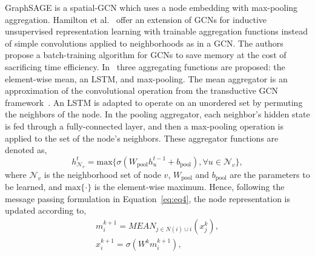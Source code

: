 GraphSAGE is a spatial-GCN which uses a node embedding with max-pooling aggregation. Hamilton et al.~ offer an extension of GCNs for inductive unsupervised representation learning with trainable aggregation functions instead of simple convolutions applied to neighborhoods as in a GCN. The authors propose a batch-training algorithm for GCNs to save memory at the cost of sacrificing time efficiency.
In~ three aggregating functions are proposed: the element-wise mean, an LSTM, and max-pooling. 
The mean aggregator is an approximation of the convolutional operation from the transductive GCN framework~. An LSTM is adapted to operate on an unordered set by permuting the neighbors of the node. In the pooling aggregator, each neighbor's hidden state is fed through a fully-connected layer, and then a max-pooling operation is applied to the set of the node’s neighbors.
These aggregator functions are denoted as,
\begin{equation}
h_{\mathcal{N}_v}^t = \text{max} \big\{ \sigma ( W_{\text{pool}} h_u^{t-1} + b_{\text{pool}}), \forall u \in \mathcal{N}_v    \big\}  , 
\end{equation}
where $\mathcal{N}_v$ is the neighborhood set of node $v$, $W_{\text{pool}}$ and $b_{\text{pool}}$ are the parameters to be learned, and $\text{max}\{ \cdot \}$ is the element-wise maximum.
Hence, following the message passing formulation in Equation{~\ref{eq:eq4}}, the node representation is updated according to, 
\vspace{-2pt}
\begin{equation}
\begin{split}
m_i^{k+1} = MEAN_{j \in N(i) \cup i } ( x_j^k )  , \\
x_i^{k+1} = \sigma (W^k m_i^{k+1}), 
\end{split}
\end{equation}


